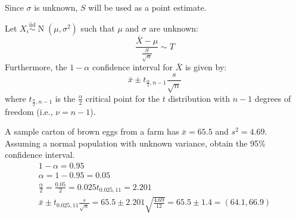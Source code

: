 \documentclass[letterpaper,12pt,fleqn]{article}
\newcommand{\iid}{\overset{\text{iid}}{\sim}}
\renewcommand{\a}{\alpha}
\newcommand{\m}{\mu}
\renewcommand{\o}{\sigma}
\renewcommand{\v}{\nu}
\newcommand{\td}[2]{t_{{#1},{#2}}}
\DeclareMathOperator{\nd}{N}
\begin{document}
Since \(\o\) is unknown, \(S\) will be used as a point estimate.

\begin{theorem}
  Let \(X_i\iid\nd(\m,\o^2)\) such that \(\m\) and \(\o\) are unknown:
  \[\frac{\bar{X}-\m}{\frac{S}{\sqrt{n}}}\sim T\]
  Furthermore, the \(1-\a\) confidence interval for \(\bar{X}\) is given by:
  \[\bar{x}\pm\td{\frac{\a}{2}}{n-1}\frac{s}{\sqrt{n}}\]
  where \(\td{\frac{\a}{2}}{n-1}\) is the \(\frac{\a}{2}\) critical point for the \(t\) distribution with \(n-1\) degrees
  of freedom (i.e., \(\v=n-1\)).
\end{theorem}

\begin{example}
  A sample carton of brown eggs from a farm has \(\bar{x}=65.5\) and \(s^2=4.69\).  Assuming a normal population with
  unknown variance, obtain the 95\% confidence interval.
  \begin{gather*}
    1-\a=0.95 \\
    \a=1-0.95=0.05 \\
    \frac{\a}{2}=\frac{0.05}{2}=0.025
    \td{0.025}{11}=2.201
    \\
    \bar{x}\pm\td{0.025}{11}\frac{s}{\sqrt{n}}=65.5\pm2.201\sqrt{\frac{4.69}{12}}=65.5\pm1.4=(64.1,66.9)
  \end{gather*}
\end{example}
\end{document}
